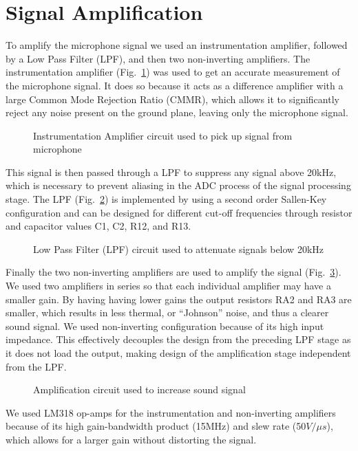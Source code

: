 \section{Signal Amplification}
To amplify the microphone signal we used an instrumentation amplifier, followed by a Low Pass Filter (LPF), and then two non-inverting amplifiers.
The instrumentation amplifier (Fig.~\ref{fig:inamp_circuit}) was used to get an accurate measurement of the microphone signal. It does so because it acts as a difference amplifier with a large Common Mode Rejection Ratio (CMMR), which allows it to significantly reject any noise present on the ground plane\cite[p.~86]{Franco2015}, leaving only the microphone signal. 
\begin{figure}[!htb]
	\centering
	\caption{Instrumentation Amplifier circuit used to pick up signal from microphone}
	\label{fig:inamp_circuit}
\end{figure}
This signal is then passed through a LPF to suppress any signal above 20kHz, which is necessary to prevent aliasing in the ADC process of the signal processing stage. The LPF (Fig.~\ref{fig:LPF_circuit}) is implemented by using a second order Sallen-Key configuration\cite[p.~279]{Horowitz1989} and can be designed for different cut-off frequencies through resistor and capacitor values C1, C2, R12, and R13. 
\begin{figure}[!htb]
	\centering
	\caption{Low Pass Filter (LPF) circuit used to attenuate signals below 20kHz}
	\label{fig:LPF_circuit}
\end{figure}
Finally the two non-inverting amplifiers are used to amplify the signal (Fig.~\ref{fig:amplifier_circuit}). We used two amplifiers in series so that each individual amplifier may have a smaller gain. By having having lower gains the output resistors RA2 and RA3 are smaller, which results in less thermal, or ``Johnson'' noise, and thus a clearer sound signal. We used non-inverting configuration because of its high input impedance. This effectively decouples the design from the preceding LPF stage as it does not load the output, making design of the amplification stage independent from the LPF. 
\begin{figure}[!htb]
	\centering
	\caption{Amplification circuit used to increase sound signal}
	\label{fig:amplifier_circuit}
\end{figure}
We used LM318 op-amps for the instrumentation and non-inverting amplifiers because of its high gain-bandwidth product (15MHz) and slew rate (50$V/\mu s$), which allows for a larger gain without distorting the signal.

